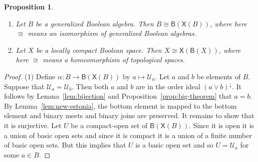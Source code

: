 \documentclass[a4paper]{amsart}
\newtheorem{proposition}[theorem]{Proposition}
\begin{document}
\begin{proposition}\label{prop:second-big-theorem}\mbox{}
\begin{enumerate}

\item Let $B$ be a generalized Boolean algebra.
Then $B \cong \mathsf{B} (\mathsf{X}(B))$, where here $\cong$ means an isomorphism of generalized Boolean algebras.

\item Let $X$ be a locally compact Boolean space.
Then $X \cong \mathsf{X} (\mathsf{B}(X))$, where here $\cong$ means a homeomorphism of topological spaces.

\end{enumerate}
\end{proposition}
\begin{proof} (1) Define $\alpha \colon B \rightarrow \mathsf{B} (\mathsf{X}(B))$ by $a \mapsto \mathscr{U}_{a}$.
Let $a$ and $b$ be elements of $B$.
Suppose that $\mathscr{U}_{a} = \mathscr{U}_{b}$.
Then both $a$ and $b$ are in the order ideal $(a \vee b)^{\downarrow}$.
It follows by Lemma~\ref{lem:bijection} and Proposition~\ref{prop:big-theorem} that $a = b$.
By Lemma~\ref{lem:new-estonia}, the bottom element is mapped to the bottom element
and binary meets and binary joins are preserved.
It remains to show that it is surjective.
Let $U$ be a compact-open set of $\mathsf{B} (\mathsf{X}(B))$.
Since it is open it is a union of basic open sets and since it is compact it is 
a union of a finite number of basic open sets.
But this implies that $U$ is a basic open set and so $U = \mathscr{U}_{a}$ for some $a \in B$.


\end{proof}
\end{document}
